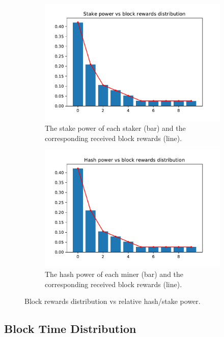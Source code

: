 \documentclass[a4paper]{article}
\begin{document}
\begin{figure}
    \centering
    \begin{subfigure}[b]{0.45\textwidth}
        \includegraphics[width=\textwidth]{assets/stake-power-vs-rewards.pdf}
        \caption{The stake power of each staker (bar) and the corresponding received block rewards (line).}
    \end{subfigure}
    \begin{subfigure}[b]{0.45\textwidth}
        \includegraphics[width=\textwidth]{assets/hash-power-vs-rewards.pdf}
        \caption{The hash power of each miner (bar) and the corresponding received block rewards (line).}
    \end{subfigure}
    \caption{Block rewards distribution vs relative hash/stake power.}
    \label{fig:block-rewards}
\end{figure}

\subsection{Block Time Distribution}
\end{document}
